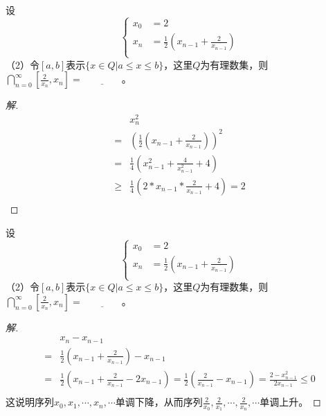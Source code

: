 \documentclass{beamer}
\begin{document}
\begin{CJK*}{UTF8}{gbsn}
\begin{frame}[t]
  \begin{Exercise}
    设\[
    \begin{cases}
      x_0&=2\\
      x_n&=\frac{1}{2}(x_{n-1}+\frac{2}{x_{n-1}})\\
    \end{cases}
    \]
  （2）令$[a,b]$表示$\{x\in Q|a\leq x \leq b\}$，这里$Q$为有理数集，则$\bigcap_{n=0}^{\infty}[\frac{2}{x_n},x_n]=\underline{\quad\quad\quad\quad}$。
  \end{Exercise}
  \begin{proof}[解]\vspace{-1cm}
  \begin{align*}
     &x_n^2\\
     =&(\frac{1}{2}(x_{n-1}+\frac{2}{x_{n-1}}))^2\\
     =&\frac{1}{4}(x_{n-1}^2+\frac{4}{x_{n-1}^2}+4)\\
   \geq&\frac{1}{4}(2*x_{n-1}*\frac{2}{x_{n-1}}+4)=2\\
  \end{align*}
\end{proof}
\end{frame}
\begin{frame}[t]
  \begin{Exercise}
    设\[
    \begin{cases}
      x_0&=2\\
      x_n&=\frac{1}{2}(x_{n-1}+\frac{2}{x_{n-1}})\\
    \end{cases}
    \]
  （2）令$[a,b]$表示$\{x\in Q|a\leq x \leq b\}$，这里$Q$为有理数集，则$\bigcap_{n=0}^{\infty}[\frac{2}{x_n},x_n]=\underline{\quad\quad\quad\quad}$。
  \end{Exercise}
   \begin{proof}[解]\justifying\let\raggedright\justifying\vspace{-1cm}
  \begin{align*}
    &x_n-x_{n-1}\\
    =&\frac{1}{2}(x_{n-1}+\frac{2}{x_{n-1}})-x_{n-1}\\
    =&\frac{1}{2}(x_{n-1}+\frac{2}{x_{n-1}}-2x_{n-1})
    =\frac{1}{2}(\frac{2}{x_{n-1}}-x_{n-1})=\frac{2-x_{n-1}^2}{2x_{n-1}}\leq 0\\
  \end{align*}
   这说明序列$x_0,x_1,\cdots,x_n,\cdots$单调下降，从而序列$\frac{2}{x_0},\frac{2}{x_1},\cdots,\frac{2}{x_n},\cdots$单调上升。
 \end{proof}

\end{frame}
\end{CJK*}
\end{document}
